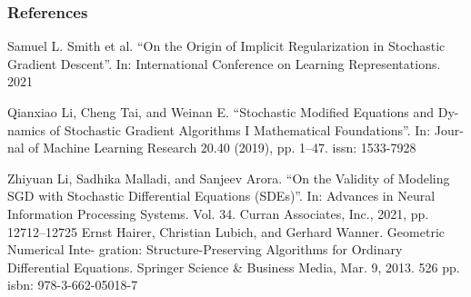 \documentclass[aspectratio=1610,10pt,ucs]{beamer} %
\begin{document}
\begin{frame}
  \frametitle{References}
  
  \begin{thebibliography}{}
  Samuel L. Smith et al. “On the Origin of Implicit Regularization in Stochastic
  Gradient Descent”. In: International Conference on Learning Representations. 2021

  Qianxiao Li, Cheng Tai, and Weinan E. “Stochastic Modified Equations and Dy-
  namics of Stochastic Gradient Algorithms I Mathematical Foundations”. In: Jour-
  nal of Machine Learning Research 20.40 (2019), pp. 1–47. issn: 1533-7928

  Zhiyuan Li, Sadhika Malladi, and Sanjeev Arora. “On the Validity of Modeling SGD
with Stochastic Differential Equations (SDEs)”. In: Advances in Neural Information
Processing Systems. Vol. 34. Curran Associates, Inc., 2021, pp. 12712–12725
  Ernst Hairer, Christian Lubich, and Gerhard Wanner. Geometric Numerical Inte-
  gration: Structure-Preserving Algorithms for Ordinary Differential Equations. Springer
  Science \& Business Media, Mar. 9, 2013. 526 pp. isbn: 978-3-662-05018-7
  \end{thebibliography}

\end{frame}
\end{document}
